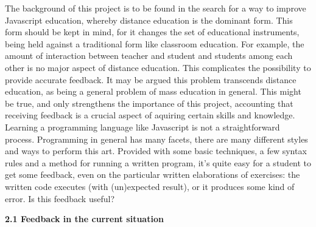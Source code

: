 \documentclass{article}
\begin{document}
\noindent
The background of this project is to be found in the search for a way to improve Javascript education, whereby distance education is the dominant form. This form should be kept in mind, for it changes the set of educational instruments, being held against a traditional form like classroom education. For example, the amount of interaction between teacher and student and students among each other is no major aspect of distance education. This complicates the possibility to provide accurate feedback. It may be argued this problem transcends distance education, as being a general problem of mass education in general. This might be true, and only strengthens the importance of this project, accounting that receiving feedback is a crucial aspect of aquiring certain skills and knowledge. 
\newline
Learning a programming language like Javascript is not a straightforward process. Programming in general has many facets, there are many different styles and ways to perform this art. Provided with some basic techniques, a few syntax rules and a method for running a written program, it's quite easy for a student to get some feedback, even on the particular written elaborations of exercises: the written code executes (with (un)expected result), or it produces some kind of error. Is this feedback useful? 

\textbf{2.1 Feedback in the current situation}
\end{document}
